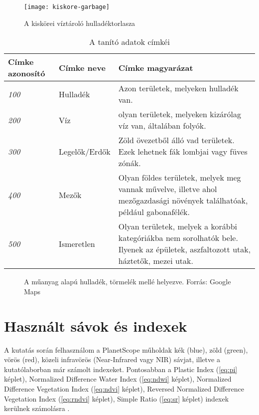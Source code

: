 \begin{figure}[H]
	\centering
	\texttt{[image: kiskore-garbage]}
	\caption{A kiskörei víztároló hulladéktorlasza \cite{petkupa2024}}
    \label{fig:kiskore-waste}
\end{figure}

\begin{table}[H]
	\centering
	\begin{tabular}{ | p{} | p{} | p{} | }
		\hline
		\textbf{Címke azonosító} & \textbf{Címke neve} & \textbf{Címke magyarázat} \\
		\hline \hline
		\emph{100} & Hulladék & Azon területek, melyeken hulladék van. \\
		\hline
		\emph{200} & Víz & olyan területek, melyeken kizárólag víz van, általában folyók. \\
		\hline
		\emph{300} & Legelők/Erdők & Zöld övezetből álló vad területek. Ezek lehetnek fák lombjai vagy füves zónák. \\
		\hline
        \emph{400} & Mezők & Olyan földes területek, melyek meg vannak művelve, illetve ahol mezőgazdasági növények találhatóak, például gabonafélék. \\
		\hline
        \emph{500} & Ismeretlen & Olyan területek, melyek a korábbi kategóriákba nem sorolhatók bele. Ilyenek az épületek, aszfaltozott utak, háztetők, mezei utak. \\
		\hline
	\end{tabular}
	\caption{A tanító adatok címkéi}
	\label{tab:waste-detection-labels}
\end{table}

\begin{figure}[H]
	\centering
	\hspace{5pt}
	\caption{A műanyag alapú hulladék, törmelék mellé helyezve. Forrás: Google Maps}
	\label{fig:waste-vs-debris}
\end{figure}

\section{Használt sávok és indexek}

A kutatás során felhasználom a PlanetScope műholdak kék (blue), zöld (green), vörös (red), közeli infravörös (Near-Infrared vagy NIR) sávjat, illetve a kutatólaborban már számolt indexeket. Pontosabban a Plastic Index (\ref{eq:pi} képlet), Normalized Difference Water Index (\ref{eq:ndwi} képlet), Normalized Difference Vegetation Index (\ref{eq:ndvi} képlet), Reversed Normalized Difference Vegetation Index (\ref{eq:rndvi} képlet), Simple Ratio (\ref{eq:sr} képlet) indexek kerülnek számolásra \cite{Themistocleous2020, magyar2023}.

